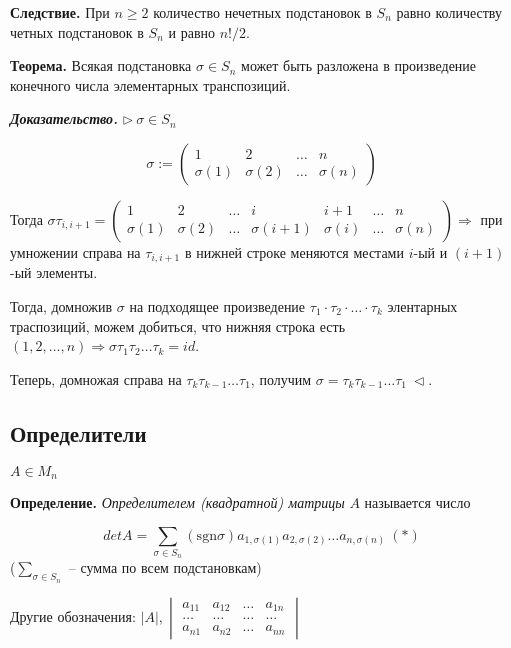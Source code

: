 \vspace{\baselineskip}
\textbf{Следствие.} При $n \geq 2$ количество нечетных подстановок в $S_n$ равно количеству четных подстановок в $S_n$ и равно $n!/2$.

\vspace{\baselineskip}
\textbf{Теорема.} Всякая подстановка $\sigma \in S_n$ может быть разложена в произведение конечного числа элементарных транспозиций.

\vspace{\baselineskip}
\textbf{\textit{Доказательство.}} $\rhd \ \sigma \in S_n$

\[\sigma := 
\begin{pmatrix} 
	1 & 2 & \dots & n \\ 
	\sigma (1) & \sigma (2) & \dots & \sigma (n)
\end{pmatrix}\]

Тогда $\sigma \tau_{i, i+1} = \begin{pmatrix} 
	1 & 2 & \dots & i & i+1 & \dots & n \\ 
	\sigma (1) & \sigma (2) & \dots & \sigma(i+1) & \sigma(i) & \dots & \sigma (n)
\end{pmatrix} \Rightarrow$ при умножении справа на $\tau_{i, i+1}$ в нижней строке меняются местами $i$-ый и $(i+1)$-ый элементы.

Тогда, домножив $\sigma$ на подходящее произведение $\tau_1 \cdot \tau_2 \cdot \dots \cdot \tau_k$ элентарных траспозиций, можем добиться, что нижняя строка есть $(1, 2, \dots, n) \Rightarrow \sigma \tau_1 \tau_2 \dots \tau_k = id$.

Теперь, домножая справа на $\tau_k \tau_{k-1} \dots \tau_1$, получим $\sigma = \tau_k \tau_{k-1} \dots \tau_1 \ \lhd$.

\subsection{Определители}

$A \in M_n$

\vspace{\baselineskip}
\textbf{Определение.} \textit{Определителем (квадратной) матрицы} $A$ называется число 

\[ detA = \sum\limits_{\sigma \in S_n} (\mathrm{sgn} \sigma) a_{1, \sigma(1)} a_{2, \sigma(2)} \dots a_{n, \sigma(n)} \ (*)\]
($\sum\limits_{\sigma \in S_n}$ -- сумма по всем подстановкам)

\vspace{\baselineskip}
Другие обозначения: $|A|, \begin{vmatrix} a_{11} & a_{12} & \dots & a_{1n} \\ \dots & \dots & \dots & \dots \\ a_{n1} & a_{n2} & \dots & a_{nn} \end{vmatrix}$ 
 
